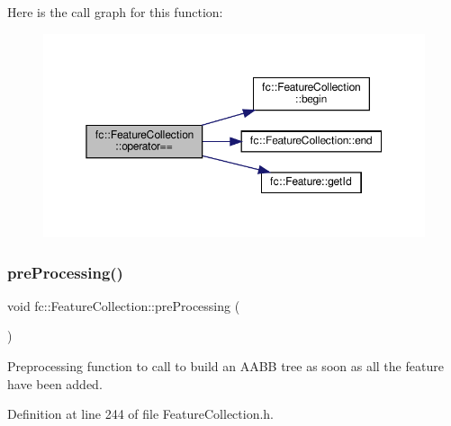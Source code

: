 Here is the call graph for this function\+:
\nopagebreak
\begin{figure}[H]
\begin{center}
\leavevmode
\includegraphics[width=350pt]{d9/d78/classfc_1_1FeatureCollection_a6286aca807e61dc6931beca4e4d1d145_cgraph}
\end{center}
\end{figure}
\mbox{\label{classfc_1_1FeatureCollection_ae2de0cf9672c5391f54b4882b86b57a2}} 
\subsubsection{\texorpdfstring{pre\+Processing()}{preProcessing()}}
{\footnotesize\ttfamily void fc\+::\+Feature\+Collection\+::pre\+Processing (\begin{DoxyParamCaption}{ }\end{DoxyParamCaption})\hspace{0.3cm}{\ttfamily [inline]}}



Preprocessing function to call to build an A\+A\+BB tree as soon as all the feature have been added. 



Definition at line 244 of file Feature\+Collection.\+h.


